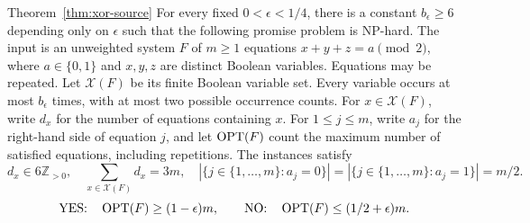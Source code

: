 \begin{restatedtheorem}{Theorem~\ref{thm:xor-source}}
For every fixed $0<\epsilon<1/4$, there is a constant
$b_\epsilon\geq6$ depending only on $\epsilon$ such that the following
promise problem is NP-hard. The input is an unweighted system $F$ of
$m\geq1$ equations $x+y+z=a\pmod2$, where $a\in\{0,1\}$ and
$x,y,z$ are distinct Boolean variables. Equations may be repeated.
Let $\mathcal X(F)$ be its finite Boolean variable set.
Every variable occurs at most $b_\epsilon$ times, with at most two
possible occurrence counts. For $x\in\mathcal X(F)$, write $d_x$ for
the number of equations containing $x$. For $1\leq j\leq m$, write
$a_j$ for the right-hand side of equation $j$,
and let $\operatorname{OPT}(F)$ count the maximum number of satisfied equations,
including repetitions. The instances satisfy
\[
d_x\in6\mathbb Z_{>0},\quad
 \sum_{x\in\mathcal X(F)}d_x=3m,\quad |\{j\in\{1,\ldots,m\}:a_j=0\}|
 =|\{j\in\{1,\ldots,m\}:a_j=1\}|=m/2.
\]
\[
 \textup{YES:}\quad\operatorname{OPT}(F)\geq(1-\epsilon)m,
 \qquad
 \textup{NO:}\quad\operatorname{OPT}(F)\leq(1/2+\epsilon)m.
\]
\end{restatedtheorem}


